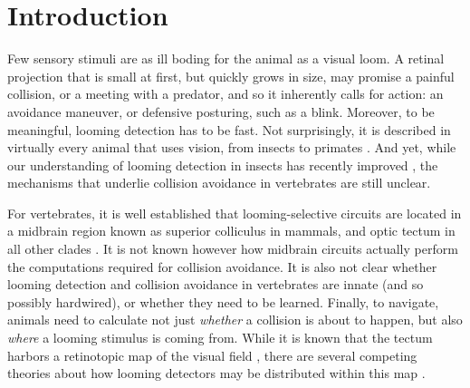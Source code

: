 \documentclass{article}
\begin{document}
\section*{Introduction}


Few sensory stimuli are as ill boding for the animal as a visual loom. A retinal projection that is small at first, but quickly grows in size, may promise a painful collision, or a meeting with a predator, and so it inherently calls for action: an avoidance maneuver, or defensive posturing, such as a blink. Moreover, to be meaningful, looming detection has to be fast. Not surprisingly, it is described in virtually every animal that uses vision, from insects to primates \citep{Pereira2016}. And yet, while our understanding of looming detection in insects has recently improved \citep{rind2016locust,von2017fruitfly}, the mechanisms that underlie collision avoidance in vertebrates are still unclear.

For vertebrates, it is well established that looming-selective circuits are located in a midbrain region known as superior colliculus in mammals, and optic tectum in all other clades \citep{frost2004review, liu2011cat, khakhalin2014, dunn2016escapesZF}. It is not known however how midbrain circuits actually perform the computations required for collision avoidance. It is also not clear whether looming detection and collision avoidance in vertebrates are innate (and so possibly hardwired), or whether they need to be learned. Finally, to navigate, animals need to calculate not just \textit{whether} a collision is about to happen, but also \textit{where} a looming stimulus is coming from. While it is known that the tectum harbors a retinotopic map of the visual field \citep{mclaughlin2003retinotopic, ruthazer2004map}, there are several competing theories about how looming detectors may be distributed within this map \citep{frost2004review}.
\end{document}
